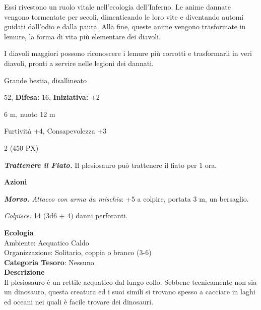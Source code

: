 \begin{multicols}{2}
{Essi rivestono un ruolo vitale nell'ecologia dell'Inferno. Le anime dannate vengono tormentate per secoli, dimenticando le loro vite e diventando automi guidati dall'odio e dalla paura. Alla fine, queste anime vengono trasformate in lemure, la forma di vita più elementare dei diavoli.

I diavoli maggiori possono riconoscere i lemure più corrotti e trasformarli in veri diavoli, pronti a servire nelle legioni dei dannati.

\noindent
\begin{description}[noitemsep, topsep=0pt, parsep=0pt, partopsep=0pt, leftmargin=0cm, labelwidth=2.2cm]
	\item[\textbf{Taglia/Tipo:}] Grande bestia, disallineato
	\item[\textbf{Caratt.:}] 
	\item[\textbf{Punti Ferita:}] 52,  \textbf{Difesa:} 16,  \textbf{Iniziativa:} +2
	\item[\textbf{Movimento:}] 6 m, nuoto 12 m
	\item[\textbf{Tiri Salvez.:}] 
	\item[\textbf{Comp.:}] Furtività +4, Consapevolezza +3
	\item[\textbf{Sfida:}] 2 (450 PX)\smallskip
\end{description}

\emph{\textbf{Trattenere il Fiato.}} Il plesiosauro può trattenere il fiato per 1 ora.

\textbf{Azioni}

\emph{\textbf{Morso.} Attacco con arma da mischia}: +5 a colpire, portata 3 m, un bersaglio.

\emph{Colpisce:} 14 (3d6 + 4) danni perforanti.

\textbf{Ecologia}\\
Ambiente: Acquatico Caldo\\
Organizzazione: Solitario, coppia o branco (3-6)\\
\textbf{Categoria Tesoro}: Nessuno\\
\textbf{Descrizione}\\
Il plesiosauro è un rettile acquatico dal lungo collo. Sebbene tecnicamente non sia un dinosauro, questa creatura ed i suoi simili si trovano spesso a cacciare in laghi ed oceani nei quali è facile trovare dei dinosauri.

}
\end{multicols}
